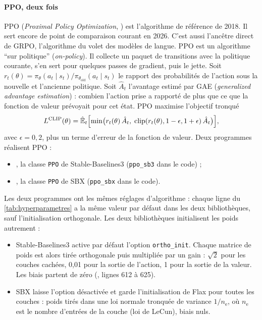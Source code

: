 \paragraph{PPO, deux fois}
PPO (\emph{Proximal Policy Optimization}, \cite{schulman2017ppo}) est l'algorithme de référence de 2018. Il
sert encore de point de comparaison courant en 2026. C'est aussi l'ancêtre direct de GRPO,
l'algorithme du volet des modèles de langue. PPO est un algorithme \enquote{sur politique} (\emph{on-policy}).
Il collecte un paquet de transitions avec la politique courante, s'en sert pour quelques passes de gradient,
puis le jette. Soit $r_t(\theta) = \pi_\theta(a_t\mid s_t)/\pi_{\theta_{\text{old}}}(a_t\mid s_t)$ le rapport
des probabilités de l'action sous la nouvelle et l'ancienne politique. Soit $\hat A_t$ l'avantage estimé par GAE
(\emph{generalized advantage estimation}) : combien l'action prise a rapporté de plus que ce que la fonction de
valeur prévoyait pour cet état. PPO maximise l'objectif tronqué
\begin{equation}\label{eq:ppo}
  L^{\text{CLIP}}(\theta) = \hat{\mathbb{E}}_t\Bigl[\min\bigl(r_t(\theta)\,\hat A_t,\;
  \operatorname{clip}(r_t(\theta), 1-\epsilon, 1+\epsilon)\,\hat A_t\bigr)\Bigr],
\end{equation}
avec $\epsilon = 0{,}2$, plus un terme d'erreur de la fonction de valeur. Deux programmes réalisent PPO :
\begin{itemize}
  \item {}, la classe \texttt{PPO} de Stable-Baselines3 (\texttt{ppo\_sb3} dans le code) ;
  \item {}, la classe \texttt{PPO} de SBX (\texttt{ppo\_sbx} dans le code).
\end{itemize}
Les deux programmes ont les mêmes réglages d'algorithme : chaque ligne du \cref{tab:hyperparametres} a la même
valeur par défaut dans les deux bibliothèques, sauf l'initialisation orthogonale. Les deux bibliothèques
initialisent les poids autrement :
\begin{itemize}
  \item Stable-Baselines3 active par défaut l'option \texttt{ortho\_init}. Chaque matrice de poids est alors
    tirée orthogonale puis multipliée par un gain : $\sqrt2$ pour les couches cachées, 0,01 pour la sortie de
    l'action, 1 pour la sortie de la valeur. Les biais partent de zéro
    (, lignes 612 à 625).
  \item SBX laisse l'option désactivée et garde l'initialisation de Flax pour toutes les couches : poids tirés
    dans une loi normale tronquée de variance $1/n_{\text{e}}$, où $n_{\text{e}}$ est le nombre d'entrées de
    la couche (loi de LeCun), biais nuls.
\end{itemize}
